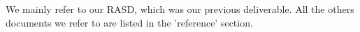 We mainly refer to our RASD, which was our previous deliverable. All the others documents we refer to are listed in the 'reference' section.